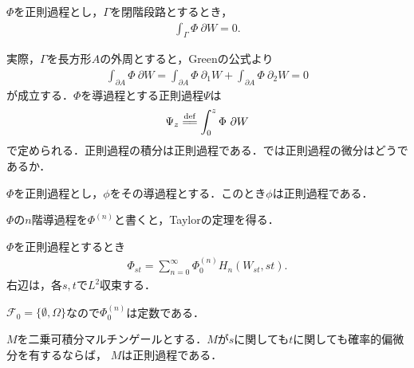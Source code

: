 	\begin{thm}
		$\Phi$を正則過程とし，$\Gamma$を閉階段路とするとき，
		\begin{align}
			\int_{\Gamma} \Phi\ \partial W = 0.
		\end{align}
	\end{thm}
	
	実際，$\Gamma$を長方形$A$の外周とすると，Greenの公式より
	\begin{align}
		\int_{\partial A} \Phi\ \partial W 
		= \int_{\partial A} \Phi\ \partial_{1} W + \int_{\partial A} \Phi\ \partial_{2} W 
		= 0
	\end{align}
	が成立する．$\Phi$を導過程とする正則過程$\Psi$は
	\begin{align}
		\Psi_{z} \defeq \int_{0}^{z} \Phi\ \partial W
	\end{align}
	で定められる．正則過程の積分は正則過程である．では正則過程の微分はどうであるか．
	
	\begin{thm}
		$\Phi$を正則過程とし，$\phi$をその導過程とする．このとき$\phi$は正則過程である．
	\end{thm}
	
	$\Phi$の$n$階導過程を$\Phi^{(n)}$と書くと，Taylorの定理を得る．
	
	\begin{thm}
		$\Phi$を正則過程とするとき
		\begin{align}
			\Phi_{st} = \sum_{n=0}^{\infty} \Phi_{0}^{(n)} H_{n}(W_{st},st).
		\end{align}
		右辺は，各$s,t$で$L^{2}$収束する．
	\end{thm}
	
	$\mathscr{F}_{0} = \{\emptyset,\Omega\}$なので$\Phi_{0}^{(n)}$は定数である．
	
	\begin{thm}
		$M$を二乗可積分マルチンゲールとする．$M$が$s$に関しても$t$に関しても確率的偏微分を有するならば，
		$M$は正則過程である．
	\end{thm}